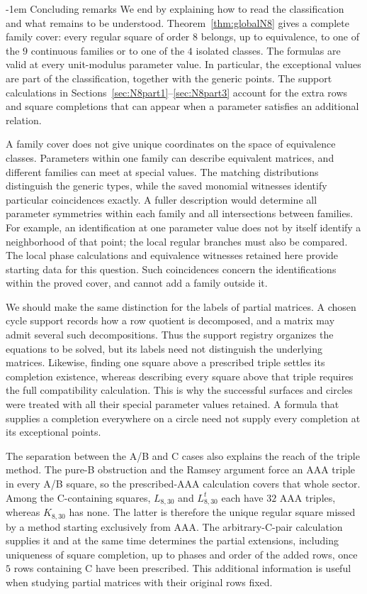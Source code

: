 \documentclass[11pt,a4paper]{article}
\makeatletter
\theoremstyle{plain}
\theoremstyle{definition}
\numberwithin{equation}{section}
\renewcommand\subsection{\@startsection{subsection}{2}{\z@}  {\medskipamount}  {-1em}  {\normalfont\normalsize\bfseries}}
\makeatother
\begin{document}
\subsection{Concluding remarks}\label{sec:conclusion}
We end by explaining how to read the classification and what remains to be understood. Theorem~\ref{thm:globalN8} gives a complete family cover: every regular square of order $8$ belongs, up to equivalence, to one of the $9$ continuous families or to one of the $4$ isolated classes. The formulas are valid at every unit-modulus parameter value. In particular, the exceptional values are part of the classification, together with the generic points. The support calculations in Sections~\ref{sec:N8part1}--\ref{sec:N8part3} account for the extra rows and square completions that can appear when a parameter satisfies an additional relation.

A family cover does not give unique coordinates on the space of equivalence classes. Parameters within one family can describe equivalent matrices, and different families can meet at special values. The matching distributions distinguish the generic types, while the saved monomial witnesses identify particular coincidences exactly. A fuller description would determine all parameter symmetries within each family and all intersections between families. For example, an identification at one parameter value does not by itself identify a neighborhood of that point; the local regular branches must also be compared. The local phase calculations and equivalence witnesses retained here provide starting data for this question. Such coincidences concern the identifications within the proved cover, and cannot add a family outside it.

We should make the same distinction for the labels of partial matrices. A chosen cycle support records how a row quotient is decomposed, and a matrix may admit several such decompositions. Thus the support registry organizes the equations to be solved, but its labels need not distinguish the underlying matrices. Likewise, finding one square above a prescribed triple settles its completion existence, whereas describing every square above that triple requires the full compatibility calculation. This is why the successful surfaces and circles were treated with all their special parameter values retained. A formula that supplies a completion everywhere on a circle need not supply every completion at its exceptional points.

The separation between the A/B and C cases also explains the reach of the triple method. The pure-B obstruction and the Ramsey argument force an AAA triple in every A/B square, so the prescribed-AAA calculation covers that whole sector. Among the C-containing squares, $L_{8,30}$ and $L_{8,30}^{t}$ each have $32$ AAA triples, whereas $K_{8,30}$ has none. The latter is therefore the unique regular square missed by a method starting exclusively from AAA. The arbitrary-C-pair calculation supplies it and at the same time determines the partial extensions, including uniqueness of square completion, up to phases and order of the added rows, once $5$ rows containing C have been prescribed. This additional information is useful when studying partial matrices with their original rows fixed.
\end{document}
